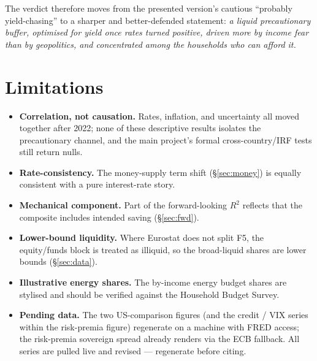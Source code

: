 \documentclass[11pt,a4paper]{article}
\begin{document}
The verdict therefore moves from the presented version's cautious ``probably
yield-chasing'' to a sharper and better-defended statement: \emph{a liquid
precautionary buffer, optimised for yield once rates turned positive, driven more
by income fear than by geopolitics, and concentrated among the households who can
afford it.}

\section{Limitations}\label{sec:limits}
\begin{itemize}
  \item \textbf{Correlation, not causation.} Rates, inflation, and uncertainty
  all moved together after 2022; none of these descriptive results isolates the
  precautionary channel, and the main project's formal cross-country/IRF tests
  still return nulls.
  \item \textbf{Rate-consistency.} The money-supply term shift (\S\ref{sec:money})
  is equally consistent with a pure interest-rate story.
  \item \textbf{Mechanical component.} Part of the forward-looking $R^2$ reflects
  that the composite includes intended saving (\S\ref{sec:fwd}).
  \item \textbf{Lower-bound liquidity.} Where Eurostat does not split F5, the
  equity/funds block is treated as illiquid, so the broad-liquid shares are lower
  bounds (\S\ref{sec:data}).
  \item \textbf{Illustrative energy shares.} The by-income energy budget shares
  are stylised and should be verified against the Household Budget Survey.
  \item \textbf{Pending data.} The two US-comparison figures (and the credit /
  VIX series within the risk-premia figure) regenerate on a machine with FRED
  access; the risk-premia sovereign spread already renders via the ECB fallback.
  All series are pulled live and revised --- regenerate before citing.
\end{itemize}
\end{document}
